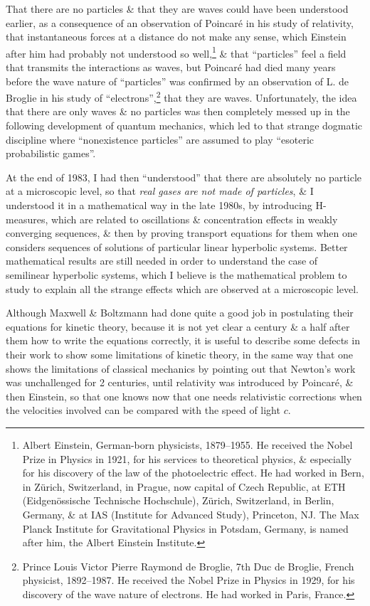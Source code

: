 \documentclass{article}
\begin{document}
\begin{enumerate}
	That there are no particles \& that they are waves could have been understood earlier, as a consequence of an observation of {\sc Poincar\'e} in his study of relativity, that instantaneous forces at a distance do not make any sense, which {\sc Einstein} after him had probably not understood so well,\footnote{{\sc Albert Einstein}, German-born physicists, 1879--1955. He received the Nobel Prize in Physics in 1921, for his services to theoretical physics, \& especially for his discovery of the law of the photoelectric effect. He had worked in Bern, in Z\"urich, Switzerland, in Prague, now capital of Czech Republic, at ETH (Eidgenössische Technische Hochschule), Zürich, Switzerland, in Berlin, Germany, \& at IAS (Institute for Advanced Study), Princeton, NJ. The Max Planck Institute for Gravitational Physics in Potsdam, Germany, is named after him, the Albert Einstein Institute.} \& that ``particles'' feel a field that transmits the interactions as waves, but {\sc Poincar\'e} had died many years before the wave nature of ``particles'' was confirmed by an observation of {\sc L. de Broglie} in his study of ``electrons'',\footnote{Prince {\sc Louis Victor Pierre Raymond de Broglie}, 7th Duc de Broglie, French physicist, 1892--1987. He received the Nobel Prize in Physics in 1929, for his discovery of the wave nature of electrons. He had worked in Paris, France.} that they are waves. Unfortunately, the idea that there are only waves \& no particles was then completely messed up in the following development of quantum mechanics, which led to that strange dogmatic discipline where ``nonexistence particles'' are assumed to play ``esoteric probabilistic games''.
	
	At the end of 1983, I had then ``understood'' that there are absolutely no particle at a microscopic level, so that {\it real gases are not made of particles}, \& I understood it in a mathematical way in the late 1980s, by introducing H-measures, which are related to oscillations \& concentration effects in weakly converging sequences, \& then by proving transport equations for them when one considers sequences of solutions of particular linear hyperbolic systems. Better mathematical results are still needed in order to understand the case of semilinear hyperbolic systems, which I believe is the mathematical problem to study to explain all the strange effects which are observed at a microscopic level.
	
	Although {\sc Maxwell \& Boltzmann} had done quite a good job in postulating their equations for kinetic theory, because it is not yet clear a century \& a half after them how to write the equations correctly, it is useful to describe some defects in their work to show some limitations of kinetic theory, in the same way that one shows the limitations of classical mechanics by pointing out that {\sc Newton}'s work was unchallenged for 2 centuries, until relativity was introduced by {\sc Poincar\'e}, \& then {\sc Einstein}, so that one knows now that one needs relativistic corrections when the velocities involved can be compared with the speed of light $c$.
	

\end{enumerate}
\end{document}
